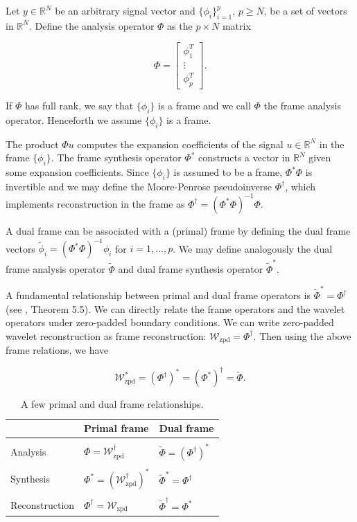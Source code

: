\documentclass[journal]{IEEEtran}
\newcommand{\reals}{\mathbb{R}}
\newcommand{\dual}{\widetilde}
\begin{document}
Let $y\in\reals^N$ be an arbitrary signal vector and $\{\phi_i\}_{i=1}^p$, $p\ge N$, be a set of vectors in $\reals^N$.  Define the analysis operator $\Phi$ as the $p\times N$ matrix

\[ \Phi = \begin{bmatrix}\phi_1^T\\\vdots\\\phi_p^T\end{bmatrix}. \] 

   \noindent If $\Phi$ has full rank, we say that $\{\phi_i\}$ is a frame and we call $\Phi$ the frame analysis operator.  Henceforth we assume $\{\phi_i\}$ is a frame.
   
   The product $\Phi u$ computes the expansion coefficients of the signal ${u\in\reals^N}$ in the frame $\{\phi_i\}$.  The frame synthesis operator $\Phi^\ast$ constructs a vector in $\reals^N$ given some expansion coefficients.  Since $\{\phi_i\}$ is assumed to be a frame, $\Phi^\ast\Phi$ is invertible and we may define the Moore-Penrose pseudoinverse $\Phi^\dagger$, which implements reconstruction in the frame as $\Phi^\dagger=\left(\Phi^\ast\Phi\right)^{-1}\Phi$.

   A dual frame can be associated with a (primal) frame by defining the dual frame vectors $\dual{\phi}_i = \left(\Phi^\ast\Phi\right)^{-1}\phi_i$ for $i=1,...,p$.  We may define analogously the dual frame analysis operator $\dual{\Phi}$ and dual frame synthesis operator $\dual{\Phi}^\ast$.

   \noindent A fundamental relationship between primal and dual frame operators is $\dual{\Phi}^\ast = \Phi^\dagger$ (see \cite{mallat_2009}, Theorem 5.5).  We can directly relate the frame operators and the wavelet operators under zero-padded boundary conditions.  We can write zero-padded wavelet reconstruction as frame reconstruction: $\mathcal{W}_\text{zpd}=\Phi^\dagger$.  Then using the above frame relations, we have

   \begin{equation}
      \label{eq:wave_dual_frame}
      \mathcal{W}_\text{zpd}^\ast = \left(\Phi^\dagger\right)^\ast = \left(\Phi^\ast\right)^\dagger = \dual{\Phi}.
   \end{equation}

\begin{table}[ht]
   \centering
   \caption{A few primal and dual frame relationships.}
   \label{tab:frame_relations}
   \begin{tabular}{lll}
      &Primal frame&Dual frame\\\hline\\[-0.5em]
      Analysis & $\Phi = \mathcal{W}_\text{zpd}^\dagger$ & $\dual{\Phi}=\left(\Phi^\dagger\right)^\ast$\\\\[-0.5em]
      Synthesis & $\Phi^\ast = \left(\mathcal{W}_\text{zpd}^\dagger\right)^\ast$ & $\dual{\Phi}^\ast = \Phi^\dagger$ \\\\[-0.5em]
      Reconstruction & $\Phi^\dagger = \mathcal{W}_\text{zpd}$ & $\dual{\Phi}^\dagger = \Phi^\ast$
   \end{tabular}
\end{table}
\end{document}
